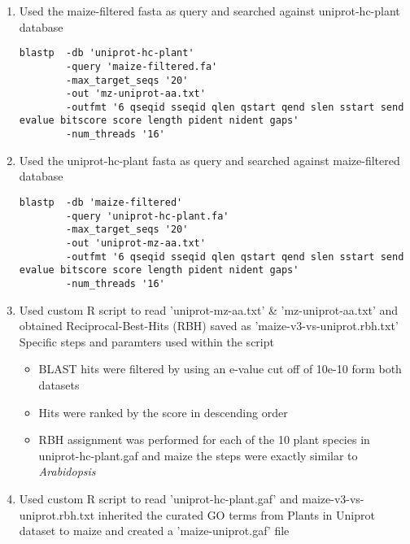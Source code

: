 \documentclass[11pt,letterpaper]{article}
\begin{document}
\begin{enumerate}
\begin{enumerate}
      \item Used the maize-filtered fasta as query and searched against uniprot-hc-plant database
      \begin{verbatim}
blastp  -db 'uniprot-hc-plant'
        -query 'maize-filtered.fa'
        -max_target_seqs '20'
        -out 'mz-uniprot-aa.txt'
        -outfmt '6 qseqid sseqid qlen qstart qend slen sstart send evalue bitscore score length pident nident gaps'
        -num_threads '16'
      \end{verbatim}
      \item Used the uniprot-hc-plant fasta as query and searched against maize-filtered database
      \begin{verbatim}
blastp  -db 'maize-filtered'
        -query 'uniprot-hc-plant.fa'
        -max_target_seqs '20'
        -out 'uniprot-mz-aa.txt'
        -outfmt '6 qseqid sseqid qlen qstart qend slen sstart send evalue bitscore score length pident nident gaps'
        -num_threads '16'
      \end{verbatim}
      \item Used custom R script to read 'uniprot-mz-aa.txt' \& 'mz-uniprot-aa.txt' and obtained Reciprocal-Best-Hits (RBH) saved as 'maize-v3-vs-uniprot.rbh.txt' \\
          Specific steps and paramters used within the script
        \begin{itemize}
          \item BLAST hits were filtered by using an e-value cut off of 10e-10 form both datasets
          \item Hits were ranked by the score in descending order
          \item RBH assignment was performed for each of the 10 plant species in uniprot-hc-plant.gaf and maize the steps were exactly similar to \emph{Arabidopsis}
        \end{itemize}
      \item Used custom R script to read 'uniprot-hc-plant.gaf' and maize-v3-vs-uniprot.rbh.txt inherited the curated GO terms from Plants in Uniprot dataset to maize and created a 'maize-uniprot.gaf' file
    \end{enumerate}
  \end{enumerate}
\end{document}

